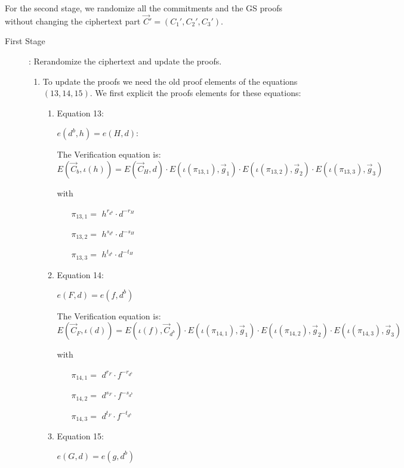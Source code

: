 For the second stage, we randomize all the commitments and the GS proofs without changing the ciphertext part $\vec{C}' = (C_1', C_2', C_3')$.
\begin{description}
\item[First Stage]: Rerandomize the ciphertext and update the proofs.
  \begin{enumerate}
  \item To update the proofs we need the old proof elements of the equations $(13, 14, 15)$. We first explicit the proofs elements for these equations:
    \begin{enumerate}
    \item Equation 13:

      $e(\boxed{d^b},h) = e(\boxed{H}, d)$: 
      
      The Verification equation is: $E(\vec{C}_b, \iota(h)) = E(\vec{C}_{H}, d) \cdot E(\iota(\pi_{13,1}), \vec{g}_1)\cdot E(\iota(\pi_{13,2}), \vec{g}_2)\cdot E(\iota(\pi_{13,3}), \vec{g}_3)$

      with
      \begin{itemize}
      \item[$\pi_{13,1} = $] $h^{r_{d^b}} \cdot d^{-r_{H}}$
      \item[$\pi_{13,2} = $] $h^{s_{d^b}} \cdot d^{-s_{H}}$
      \item[$\pi_{13,3} = $] $h^{t_{d^b}} \cdot d^{-t_{H}}$
      \end{itemize}
      
    \item Equation 14:

      $e(\boxed{F},d) = e(f, \boxed{d^b})$

      The Verification equation is: $E(\vec{C}_F, \iota(d)) = E(\iota(f), \vec{C}_{d^b}) \cdot E(\iota(\pi_{14,1}), \vec{g}_1)\cdot E(\iota(\pi_{14,2}), \vec{g}_2)\cdot E(\iota(\pi_{14,3}), \vec{g}_3)$

      with

      \begin{itemize}
      \item[$\pi_{14,1} = $] $d^{r_F} \cdot f^{-r_{d^b}}$    
      \item[$\pi_{14,2} = $] $d^{s_F} \cdot f^{-s_{d^b}}$    
      \item[$\pi_{14,3} = $] $d^{t_F} \cdot f^{-t_{d^b}}$
      \end{itemize}
      
    \item Equation 15:

      $e(\boxed{G},d) = e(g, \boxed{d^b})$


\end{enumerate}
\end{enumerate}
\end{description}

